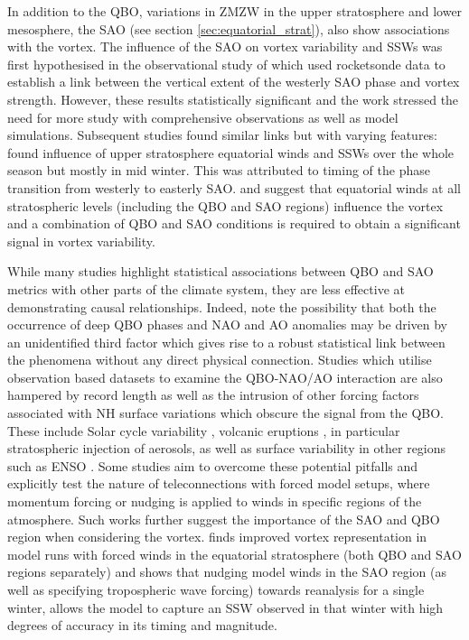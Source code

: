 In addition to the QBO, variations in ZMZW in the upper stratosphere and lower mesosphere, the SAO (see section \ref{sec:equatorial_strat}), also show associations with the vortex. The influence of the SAO on vortex variability and SSWs was first hypothesised in the observational study of \cite{grayData2001} which used rocketsonde data to establish a link between the vertical extent of the westerly SAO phase and vortex strength. However, these results statistically significant and the work stressed the need for more study with comprehensive observations as well as model simulations. Subsequent studies found similar links but with varying features: \cite{grayinfluence2003} found influence of upper stratosphere equatorial winds and SSWs over the whole season but mostly in mid winter. This was attributed to timing of the phase transition from westerly to easterly SAO. \cite{grayData2001} and \cite{hamiltonEffects1998} suggest that equatorial winds at all stratospheric levels (including the QBO and SAO regions) influence the vortex and a combination of QBO and SAO conditions is required to obtain a significant signal in vortex variability.

While many studies highlight statistical associations between QBO and SAO metrics with other parts of the climate system, they are less effective at demonstrating causal relationships. Indeed, \cite{andrewsObserved2019d} note the possibility that both the occurrence of deep QBO phases and NAO and AO anomalies may be driven by an unidentified third factor which gives rise to a robust statistical link between the phenomena without any direct physical connection. Studies which utilise observation based datasets to examine the QBO-NAO/AO interaction are also hampered by record length as well as the intrusion of other forcing factors associated with NH surface variations which obscure the signal from the QBO. These include Solar cycle variability \citep{GrayElevenyear2016}, volcanic eruptions \citep{stenchikovArctic2004}, in particular stratospheric injection of aerosols, as well as surface variability in other regions such as ENSO \citep{bellStratospheric2009}. Some studies aim to overcome these potential pitfalls and explicitly test the nature of teleconnections with forced model setups, where momentum forcing or nudging is applied to winds in specific regions of the atmosphere. Such works further suggest the importance of the SAO and QBO region when considering the vortex. \cite{pascoeQuasibiennial2005b} finds improved vortex representation in model runs with forced winds in the equatorial stratosphere (both QBO and SAO regions separately) and \cite{grayForecasting2020a} shows that nudging model winds in the SAO region (as well as specifying tropospheric wave forcing) towards reanalysis for a single winter, allows the model to capture an SSW observed in that winter with high degrees of accuracy in its timing and magnitude.   

